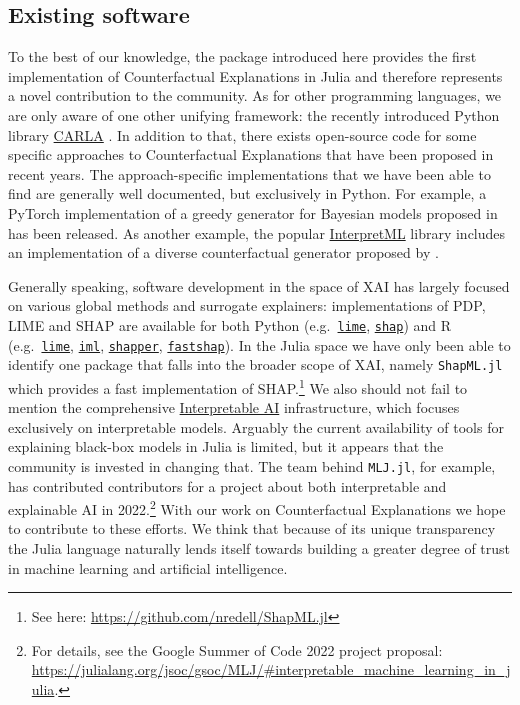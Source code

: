 \documentclass[
  letterpaper,
  DIV=11,
  numbers=noendperiod]{scrartcl}
\begin{document}
\hypertarget{existing-software}{%
\subsection{Existing software}\label{existing-software}}

To the best of our knowledge, the package introduced here provides the
first implementation of Counterfactual Explanations in Julia and
therefore represents a novel contribution to the community. As for other
programming languages, we are only aware of one other unifying
framework: the recently introduced Python library
\href{https://carla-counterfactual-and-recourse-library.readthedocs.io/en/latest/?badge=latest}{CARLA}
\cite{pawelczyk2021carla}. In addition to that, there exists open-source
code for some specific approaches to Counterfactual Explanations that
have been proposed in recent years. The approach-specific
implementations that we have been able to find are generally well
documented, but exclusively in Python. For example, a PyTorch
implementation of a greedy generator for Bayesian models proposed in
\cite{schut2021generating} has been released. As another example, the
popular \href{https://github.com/interpretml}{InterpretML} library
includes an implementation of a diverse counterfactual generator
proposed by \cite{mothilal2020explaining}.

Generally speaking, software development in the space of XAI has largely
focused on various global methods and surrogate explainers:
implementations of PDP, LIME and SHAP are available for both Python
(e.g.~\href{https://github.com/marcotcr/lime}{\texttt{lime}},
\href{https://github.com/slundberg/shap}{\texttt{shap}}) and R
(e.g.~\href{https://cran.r-project.org/web/packages/lime/index.html}{\texttt{lime}},
\href{https://cran.r-project.org/web/packages/lime/index.html}{\texttt{iml}},
\href{https://modeloriented.github.io/shapper/}{\texttt{shapper}},
\href{https://github.com/bgreenwell/fastshap}{\texttt{fastshap}}). In
the Julia space we have only been able to identify one package that
falls into the broader scope of XAI, namely \texttt{ShapML.jl} which
provides a fast implementation of SHAP.\footnote{See here:
  \url{https://github.com/nredell/ShapML.jl}} We also should not fail to
mention the comprehensive
\href{https://docs.interpretable.ai/stable/IAIBase/data/}{Interpretable
AI} infrastructure, which focuses exclusively on interpretable models.
Arguably the current availability of tools for explaining black-box
models in Julia is limited, but it appears that the community is
invested in changing that. The team behind \texttt{MLJ.jl}, for example,
has contributed contributors for a project about both interpretable and
explainable AI in 2022.\footnote{For details, see the Google Summer of
  Code 2022 project proposal:
  \url{https://julialang.org/jsoc/gsoc/MLJ/\#interpretable_machine_learning_in_julia}.}
With our work on Counterfactual Explanations we hope to contribute to
these efforts. We think that because of its unique transparency the
Julia language naturally lends itself towards building a greater degree
of trust in machine learning and artificial intelligence.
\end{document}
